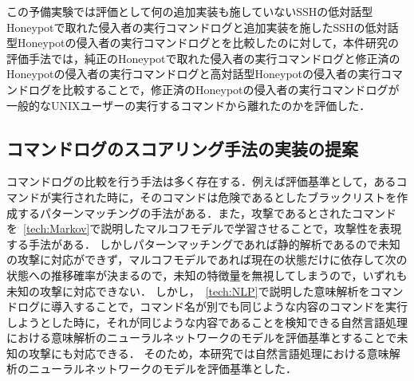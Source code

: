 この予備実験では評価として何の追加実装も施していないSSHの低対話型Honeypotで取れた侵入者の実行コマンドログと追加実装を施したSSHの低対話型Honeypotの侵入者の実行コマンドログとを比較したのに対して，本件研究の評価手法では，純正のHoneypotで取れた侵入者の実行コマンドログと修正済のHoneypotの侵入者の実行コマンドログと高対話型Honeypotの侵入者の実行コマンドログを比較することで，修正済のHoneypotの侵入者の実行コマンドログが一般的なUNIXユーザーの実行するコマンドから離れたのかを評価した．%




\subsection{コマンドログのスコアリング手法の実装の提案}
\label{eval:implsuge}
コマンドログの比較を行う手法は多く存在する．例えば評価基準として，あるコマンドが実行された時に，そのコマンドは危険であるとしたブラックリストを作成するパターンマッチングの手法がある．また，攻撃であるとされたコマンドを~\ref{tech:Markov}で説明したマルコフモデルで学習させることで，攻撃性を表現する手法がある．
しかしパターンマッチングであれば静的解析であるので未知の攻撃に対応ができず，マルコフモデルであれば現在の状態だけに依存して次の状態への推移確率が決まるので，未知の特徴量を無視してしまうので，いずれも未知の攻撃に対応できない．
しかし，~\ref{tech:NLP}で説明した意味解析をコマンドログに導入することで，コマンド名が別でも同じような内容のコマンドを実行しようとした時に，それが同じような内容であることを検知できる自然言語処理における意味解析のニューラルネットワークのモデルを評価基準とすることで未知の攻撃にも対応できる．
そのため，本研究では自然言語処理における意味解析のニューラルネットワークのモデルを評価基準とした．

